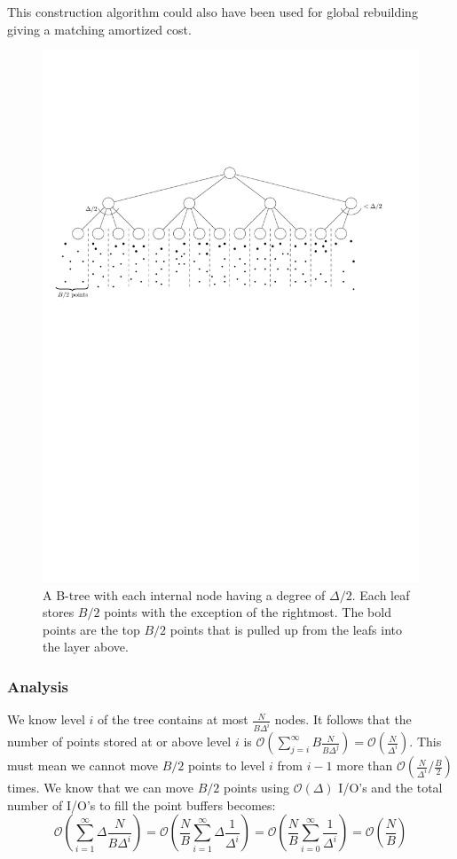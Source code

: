 \documentclass[twoside,11pt,openright]{report}
\begin{document}
This construction algorithm could also have been used for global rebuilding giving a matching amortized cost.

\begin{figure}
	\centering
	\includegraphics[width=\textwidth]{../figures/gerth_construction}
	\caption{A B-tree with each internal node having a degree of $\Delta/2$. Each leaf stores $B/2$ points with the exception of the rightmost. The bold points are the top $B/2$ points that is pulled up from the leafs into the layer above.}
	\label{fig:gerth_construction}
\end{figure}

\subsubsection*{Analysis}

We know level $i$ of the tree contains at most $\frac{N}{B\Delta^i}$ nodes. It follows that the number of points stored at or above level $i$ is $\mathcal{O}(\sum\limits_{j=i}^\infty B\frac{N}{B\Delta^j}) = \mathcal{O}(\frac{N}{\Delta^i})$. This must mean we cannot move $B/2$ points to level $i$ from $i-1$ more than $\mathcal{O}(\frac{N}{\Delta^i} / \frac{B}{2})$ times. We know that we can move $B/2$ points using $\mathcal{O}(\Delta)$ I/O's and the total number of I/O's to fill the point buffers becomes:
$$\mathcal{O}\left(\sum\limits_{i=1}^\infty \Delta \frac{N}{B\Delta^i}\right) = \mathcal{O}\left(\frac{N}{B}\sum\limits_{i=1}^\infty \Delta \frac{1}{\Delta^i}\right) = \mathcal{O}\left(\frac{N}{B}\sum\limits_{i=0}^\infty \frac{1}{\Delta^i}\right) = \mathcal{O}\left(\frac{N}{B}\right)$$
\end{document}
